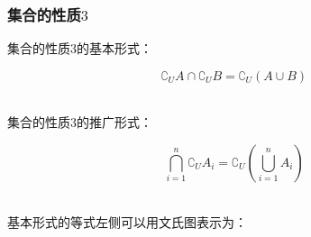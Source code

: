 \documentclass[UTF8]{ctexart}
\begin{document}
\subsubsection{集合的性质$3$}
    集合的性质$3$的基本形式：
    \begin{large}
        \begin{equation*}
            \complement_UA\cap\complement_UB=\complement_U\left(A\cup B\right)
        \end{equation*}
    \end{large}\\
    集合的性质$3$的推广形式：
    \begin{large}
        \begin{equation*}
            \bigcap_{i=1}^n \complement_UA_i=\complement_U\left(\bigcup_{i=1}^n A_i\right)
        \end{equation*}
    \end{large}\\[1mm]
    基本形式的等式左侧可以用文氏图表示为：\vspace{5pt}
\end{document}
